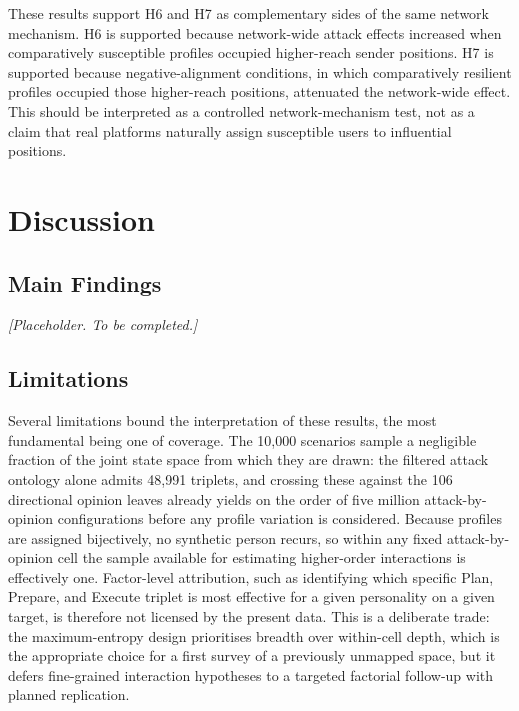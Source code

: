 \documentclass[11pt,a4paper]{article}
\begin{document}
These results support H6 and H7 as complementary sides of the same network mechanism. H6 is
supported because network-wide attack effects increased when comparatively susceptible profiles
occupied higher-reach sender positions. H7 is supported because negative-alignment conditions, in
which comparatively resilient profiles occupied those higher-reach positions, attenuated the
network-wide effect. This should be interpreted as a controlled network-mechanism test, not as a
claim that real platforms naturally assign susceptible users to influential positions.

\section{Discussion}

\subsection{Main Findings}

\noindent\textit{[Placeholder. To be completed.]}

\subsection{Limitations}

Several limitations bound the interpretation of these results, the most fundamental being one
of coverage. The 10,000 scenarios sample a negligible fraction of the joint state space from
which they are drawn: the filtered attack ontology alone admits 48,991 triplets, and crossing
these against the 106 directional opinion leaves already yields on the order of five million
attack-by-opinion configurations before any profile variation is considered. Because profiles
are assigned bijectively, no synthetic person recurs, so within any fixed attack-by-opinion
cell the sample available for estimating higher-order interactions is effectively one.
Factor-level attribution, such as identifying which specific Plan, Prepare, and Execute triplet
is most effective for a given personality on a given target, is therefore not licensed by the
present data. This is a deliberate trade: the maximum-entropy design prioritises breadth over
within-cell depth, which is the appropriate choice for a first survey of a previously unmapped
space, but it defers fine-grained interaction hypotheses to a targeted factorial follow-up with
planned replication.
\end{document}
